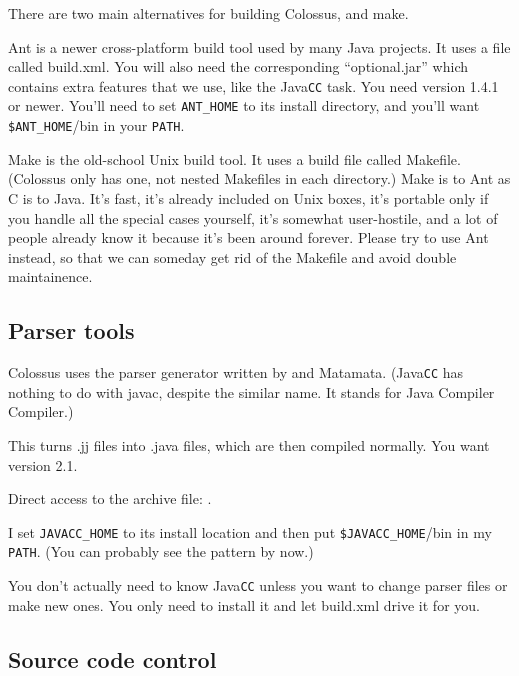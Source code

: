 \documentclass{article}
\begin{document}
There are two main alternatives for building Colossus,
 and make.

Ant is a newer cross-platform build tool used by many Java projects. 
It uses a file called build.xml. You will also need the corresponding
``optional.jar'' which contains extra features that we use, like the 
Java\texttt{CC} task. You need version 1.4.1 or newer. You'll need to set 
\texttt{ANT\_HOME} to its install directory, and you'll want
\texttt{\$ANT\_HOME}/bin in your \texttt{PATH}.

Make is the old-school Unix build tool. It uses a build file called
Makefile. (Colossus only has one, not nested Makefiles in each
directory.) Make is to Ant as C is to Java. It's fast, it's already
included on Unix boxes, it's portable only if you handle all the special
cases yourself, it's somewhat user-hostile, and a lot of people already 
know it because it's been around forever. Please try to use Ant instead, 
so that we can someday get rid of the Makefile and avoid double 
maintainence.

\subsection{Parser tools}

Colossus uses the  parser generator
written by  and Matamata.
(Java\texttt{CC} has nothing to do with javac, despite the similar name.
It stands for Java Compiler Compiler.)

This turns .jj files into .java files, which are then compiled normally. 
You want version 2.1.

Direct access to the archive file:
.

I set \texttt{JAVACC\_HOME} to its install location and then put
\texttt{\$JAVACC\_HOME}/bin in my \texttt{PATH}. (You can probably
see the pattern by now.)

You don't actually need to know Java\texttt{CC} unless you want to change
parser files or make new ones. You only need to install it and let build.xml
drive it for you.

\subsection{Source code control}
\end{document}
